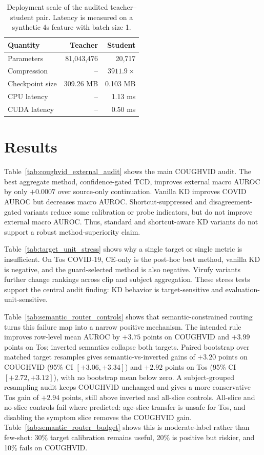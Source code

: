 \documentclass{article}
\newcommand{\toprule}{\hline}
\newcommand{\midrule}{\hline}
\newcommand{\bottomrule}{\hline}
\begin{document}
\begin{table}[t]
\centering
\scriptsize
\caption{Deployment scale of the audited teacher--student pair. Latency is measured on a synthetic 4s feature with batch size 1.}
\label{tab:efficiency}
\begin{tabular}{lrr}
\toprule
Quantity & Teacher & Student \\
\midrule
Parameters & 81,043,476 & 20,717 \\
Compression & -- & $3911.9\times$ \\
Checkpoint size & 309.26 MB & 0.103 MB \\
CPU latency & -- & 1.13 ms \\
CUDA latency & -- & 0.50 ms \\
\bottomrule
\end{tabular}
\end{table}

\section{Results}
Table~\ref{tab:coughvid_external_audit} shows the main COUGHVID audit. The best aggregate method, confidence-gated TCD, improves external macro AUROC by only $+0.0007$ over source-only continuation. Vanilla KD improves COVID AUROC but decreases macro AUROC. Shortcut-suppressed and disagreement-gated variants reduce some calibration or probe indicators, but do not improve external macro AUROC. Thus, standard and shortcut-aware KD variants do not support a robust method-superiority claim.



Table~\ref{tab:target_unit_stress} shows why a single target or single metric is insufficient. On Tos COVID-19, CE-only is the post-hoc best method, vanilla KD is negative, and the guard-selected method is also negative. Virufy variants further change rankings across clip and subject aggregation. These stress tests support the central audit finding: KD behavior is target-sensitive and evaluation-unit-sensitive.

Table~\ref{tab:semantic_router_controls} shows that semantic-constrained routing turns this failure map into a narrow positive mechanism. The intended rule improves row-level mean AUROC by $+3.75$ points on COUGHVID and $+3.99$ points on Tos; inverted semantics collapse both targets. Paired bootstrap over matched target resamples gives semantic-vs-inverted gains of $+3.20$ points on COUGHVID (95\% CI $[+3.06,+3.34]$) and $+2.92$ points on Tos (95\% CI $[+2.72,+3.12]$), with no bootstrap mean below zero. A subject-grouped resampling audit keeps COUGHVID unchanged and gives a more conservative Tos gain of $+2.94$ points, still above inverted and all-slice controls. All-slice and no-slice controls fail where predicted: age-slice transfer is unsafe for Tos, and disabling the symptom slice removes the COUGHVID gain. Table~\ref{tab:semantic_router_budget} shows this is moderate-label rather than few-shot: 30\% target calibration remains useful, 20\% is positive but riskier, and 10\% fails on COUGHVID.
\end{document}
